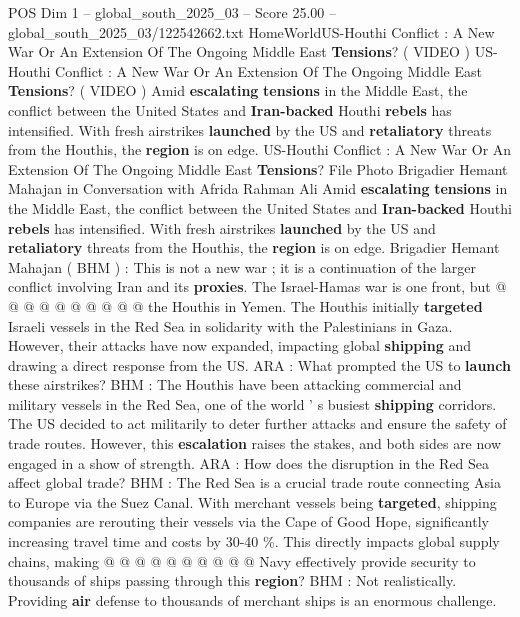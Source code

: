 \begin{textsample}{POS Dim 1 – global\_south\_2025\_03 – Score 25.00 – global\_south\_2025\_03/122542662.txt}  \label{ex:f1_pos_291}
HomeWorldUS-Houthi Conflict : A New War Or An Extension Of The Ongoing Middle East \textbf{Tensions}? ( VIDEO ) US-Houthi Conflict : A New War Or An Extension Of The Ongoing Middle East \textbf{Tensions}? ( VIDEO ) Amid \textbf{escalating} \textbf{tensions} in the Middle East, the conflict between the United States and \textbf{Iran-backed} Houthi \textbf{rebels} has intensified.
With fresh airstrikes \textbf{launched} by the US and \textbf{retaliatory} threats from the Houthis, the \textbf{region} is on edge.
US-Houthi Conflict : A New War Or An Extension Of The Ongoing Middle East \textbf{Tensions}?
File Photo Brigadier Hemant Mahajan in Conversation with Afrida Rahman Ali Amid \textbf{escalating} \textbf{tensions} in the Middle East, the conflict between the United States and \textbf{Iran-backed} Houthi \textbf{rebels} has intensified.
With fresh airstrikes \textbf{launched} by the US and \textbf{retaliatory} threats from the Houthis, the \textbf{region} is on edge.
Brigadier Hemant Mahajan ( BHM ) : This is not a new war ; it is a continuation of the larger conflict involving Iran and its \textbf{proxies}.
The Israel-Hamas war is one front, but @ @ @ @ @ @ @ @ @ @ the Houthis in Yemen.
The Houthis initially \textbf{targeted} Israeli vessels in the Red Sea in solidarity with the Palestinians in Gaza.
However, their attacks have now expanded, impacting global \textbf{shipping} and drawing a direct response from the US.
ARA : What prompted the US to \textbf{launch} these airstrikes?
BHM : The Houthis have been attacking commercial and military vessels in the Red Sea, one of the world ' s busiest \textbf{shipping} corridors.
The US decided to act militarily to deter further attacks and ensure the safety of trade routes.
However, this \textbf{escalation} raises the stakes, and both sides are now engaged in a show of strength.
ARA : How does the disruption in the Red Sea affect global trade?
BHM : The Red Sea is a crucial trade route connecting Asia to Europe via the Suez Canal.
With merchant vessels being \textbf{targeted}, shipping companies are rerouting their vessels via the Cape of Good Hope, significantly increasing travel time and costs by 30-40 \%.
This directly impacts global supply chains, making @ @ @ @ @ @ @ @ @ @ Navy effectively provide security to thousands of ships passing through this \textbf{region}?
BHM : Not realistically.
Providing \textbf{air} defense to thousands of merchant ships is an enormous challenge.

\end{textsample}
